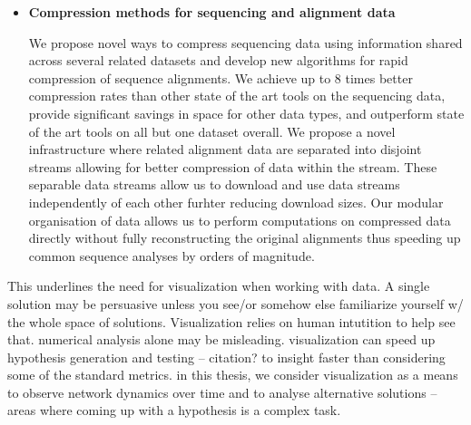 \begin{itemize}
  \item \textbf{Compression methods for sequencing and alignment data}

  We propose novel ways to compress sequencing data using information shared across several related datasets and develop new algorithms for rapid compression of sequence alignments. We achieve up to 8 times better compression rates than other state of the art tools on the sequencing data, provide significant savings in space for other data types, and outperform state of the art tools on all but one dataset overall. We propose a novel infrastructure where related alignment data are separated into disjoint streams allowing for better compression of data within the stream. These separable data streams allow us to download and use data streams independently of each other furhter reducing download sizes. Our modular organisation of data allows us to perform computations on compressed data directly without fully reconstructing the original alignments thus speeding up common sequence analyses by orders of magnitude.

\end{itemize}


This underlines the need for visualization when working with data. A single solution may be persuasive unless you see/or somehow else familiarize yourself w/ the whole space of solutions. Visualization relies on human intutition to help see that. numerical analysis alone may be misleading. visualization can speed up hypothesis generation and testing -- citation? to insight faster than considering some of the standard metrics. in this thesis, we consider visualization as a means to observe network dynamics over time and to analyse alternative solutions -- areas where coming up with a hypothesis is a complex task.

